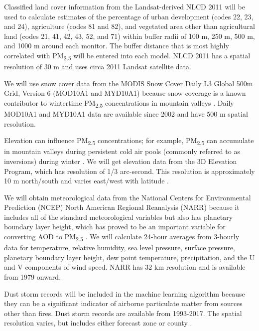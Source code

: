\documentclass[authoryear]{elsarticle}
\begin{document}
Classified land cover information from the Landsat-derived NLCD 2011 
\citep{Homer2017} will be used to calculate estimates of the percentage of urban development (codes 22, 23, and 24), agriculture (codes 81 and 82), and vegetated area other than agricultural land (codes 21, 41, 42, 43, 52, and 71) within buffer radii of 100 m, 250 m, 500 m, and 1000 m around each monitor. The buffer distance that is most highly correlated with PM\textsubscript{2.5} will be entered into each model. NLCD 2011 has a spatial resolution of 30 m and uses circa 2011 Landsat satellite data. 

We will use snow cover data from the MODIS Snow Cover Daily L3 Global 500m Grid, Version 6 (MOD10A1 and MYD10A1) \citep{Hall2016} because snow coverage is a known contributor to wintertime PM\textsubscript{2.5} concentrations in mountain valleys \citep{Whiteman2014}. Daily MOD10A1 and MYD10A1 data are available since 2002 and have 500 m spatial resolution. 

Elevation can influence PM\textsubscript{2.5} concentrations; for example, PM\textsubscript{2.5} can accumulate in mountain valleys during persistent cold air pools 
(commonly referred to as inversions) 
during winter \citep{Whiteman2014}. We will get elevation data from the 3D Elevation Program, which has resolution of 1/3 arc-second. This resolution is approximately 10 m north/south and varies east/west with latitude \citep{USGSElevation2017}.

We will obtain meteorological data from the National Centers for Environmental Prediction (NCEP) North American Regional Reanalysis (NARR) \citep{Mesinger2006,NCEPReanalysis2005} because it includes all of the standard meteorological variables but also has planetary boundary layer height, which has proved to be an important variable for converting AOD to PM\textsubscript{2.5} \citep{liu_estimating_2005}. We will calculate 24-hour averages from 3-hourly data for temperature, relative humidity, sea level pressure, surface pressure, planetary boundary layer height, dew point temperature, precipitation, and the U and V components of wind speed. NARR has 32 km resolution and is available from 1979 onward.  

Dust storm records will be included in the machine learning algorithm because they can be a significant indicator of airborne particulate matter from sources other than fires. Dust storm records are available from 1993-2017. The spatial resolution varies, but includes either forecast zone or county  \citep{NWSstorms2017,NWSrecordhistory2017,NWSInstructions2016}.
\end{document}
